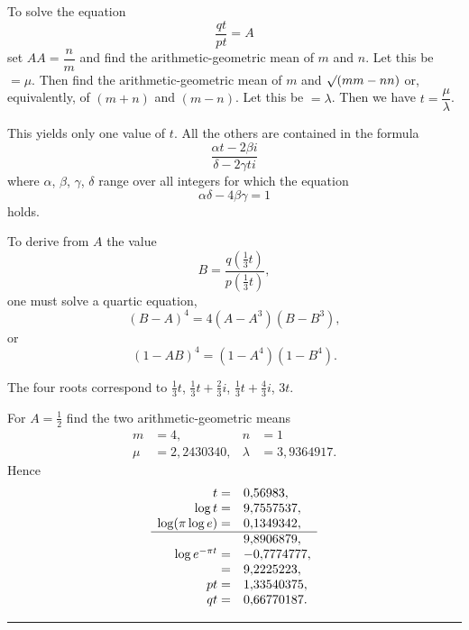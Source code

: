 To solve the equation
\[
\frac{qt}{pt}=A
\]
set $AA=\dfrac nm$ and find the arithmetic-geometric mean of $m$ and $n$. Let this be $=\mu$. Then find the arithmetic-geometric mean of $m$ and $\mathord{\surd}(mm-nn)$ or, equivalently, of $(m+n)$ and $(m-n)$. Let this be $=\lambda$. Then we have $t=\dfrac\mu\lambda$.

This yields only one value of $t$. All the others are contained in the formula
\[
\frac{\alpha t-2\beta i}{\delta-2\gamma ti}
\]
where $\alpha$, $\beta$, $\gamma$, $\delta$ range over all integers for which the equation
\[
\alpha\delta-4\beta\gamma=1
\]
holds.

To derive from $A$ the value
\[
B=\dfrac{q\!\left(\frac13t\right)}{p\!\left(\frac13t\right)},
\]
one must solve a quartic equation,
\[
(B-A)^4=4(A-A^3)(B-B^3),
\]
or
\[
(1-AB)^4=(1-A^4)(1-B^4).
\]

The four roots correspond to $\frac13t$, $\frac13t+\frac23i$, $\frac13t+\frac43i$, $3t$.

For $A=\frac12$ find the two arithmetic-geometric means
\[
\begin{aligned}
m&=4, & n&=1\\
\mu&=2{,}2430340, &\lambda&=3{,}9364917.
\end{aligned}
\]
Hence
\[
\begin{array}{rl}
t=&0{,}56983,\\
\log t=&9{,}7557537,\\
\log(\pi\log e)=&0{,}1349342,\\\hline
&9{,}8906879,\\
\log e^{-\pi t}=&-0{,}7774777,\\
{}=&9{,}2225223,\\
pt=&1{,}33540375,\\
qt=&0{,}66770187.
\end{array}
\]
\begin{center}\rule{3cm}{.4pt}\end{center}
